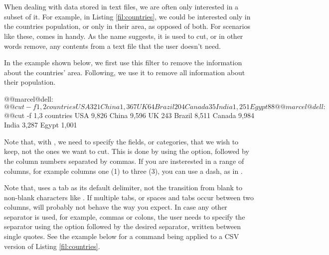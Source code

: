 \section{}

When dealing with data stored in text files, we are often only interested in a subset of it. For example, in Listing \ref{fil:countries}, we could be interested only in the countries population, or only in their area, as opposed of both. For scenarios like these,  comes in handy. As the name suggests, it is used to cut, or in other words remove, any contents from a text file that the user doesn't need.

In the example shown below, we first use this filter to remove the information about the countries' area. Following, we use it to remove all information about their population.

\begin{command_line}[Bash]
@@marcel@dell:~$ @@cut -f 1,2 countries
USA     321
China   1,367
UK      64
Brazil  204
Canada  35
India   1,251
Egypt   88
@@marcel@dell:~$ @@cut -f 1,3 countries
USA     9,826
China   9,596
UK      243
Brazil  8,511
Canada  9,984
India   3,287
Egypt   1,001
\end{command_line}

Note that, with , we need to specify the fields, or categories, that we wish to keep, not the ones we want to cut. This is done by using the  option, followed by the column numbers separated by commas. If you are insterested in a range of columns, for example columns one (1) to three (3), you can use a dash, as in .

Note that,  uses a tab as its default delimiter, not the transition from blank to non-blank characters like . If multiple tabs, or spaces and tabs occur between two columns,  will probably not behave the way you expect. In case any other separator is used, for example, commas or colons, the user needs to specify the separator using the  option followed by the desired separator, written between single quotes. See the example below for a  command being applied to a \acs{CSV} version of Listing \ref{fil:countries}.


